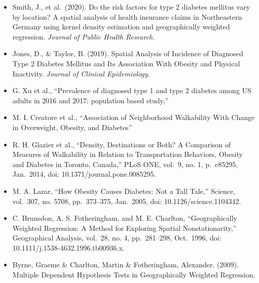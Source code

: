 \documentclass[
]{article}
\providecommand{\tightlist}{%
  \setlength{\itemsep}{0pt}\setlength{\parskip}{0pt}}\usepackage{longtable,booktabs,array}
\begin{document}
\begin{itemize}
\tightlist
\item
  Smith, J., et al.~(2020). Do the risk factors for type 2 diabetes
  mellitus vary by location? A spatial analysis of health insurance
  claims in Northeastern Germany using kernel density estimation and
  geographically weighted regression. \emph{Journal of Public Health
  Research}.
\item
  Jones, D., \& Taylor, B. (2019). Spatial Analysis of Incidence of
  Diagnosed Type 2 Diabetes Mellitus and Its Association With Obesity
  and Physical Inactivity. \emph{Journal of Clinical Epidemiology}.
\item
  G. Xu et al., ``Prevalence of diagnosed type 1 and type 2 diabetes
  among US adults in 2016 and 2017: population based study,''
\item
  M. I. Creatore et al., ``Association of Neighborhood Walkability With
  Change in Overweight, Obesity, and Diabetes''
\item
  R. H. Glazier et al., ``Density, Destinations or Both? A Comparison of
  Measures of Walkability in Relation to Transportation Behaviors,
  Obesity and Diabetes in Toronto, Canada,'' PLoS ONE, vol.~9, no. 1,
  p.~e85295, Jan.~2014, doi: 10.1371/journal.pone.0085295.
\item
  M. A. Lazar, ``How Obesity Causes Diabetes: Not a Tall Tale,''
  Science, vol.~307, no. 5708, pp.~373--375, Jan.~2005, doi:
  10.1126/science.1104342.
\item
  C. Brunsdon, A. S. Fotheringham, and M. E. Charlton, ``Geographically
  Weighted Regression: A Method for Exploring Spatial Nonstationarity,''
  Geographical Analysis, vol.~28, no. 4, pp.~281--298, Oct.~1996, doi:
  10.1111/j.1538-4632.1996.tb00936.x.
\item
  Byrne, Graeme \& Charlton, Martin \& Fotheringham, Alexander. (2009).
  Multiple Dependent Hypothesis Tests in Geographically Weighted
  Regression.
\end{itemize}
\end{document}
